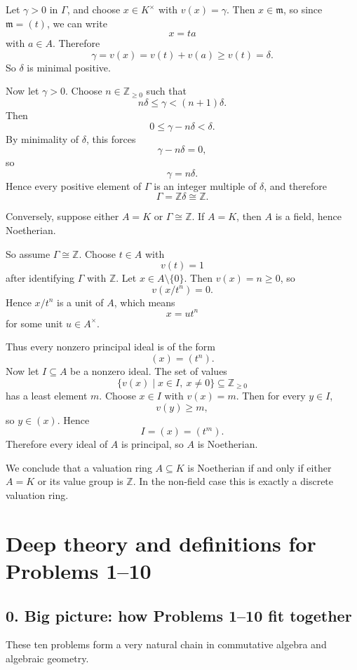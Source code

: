 \documentclass[12pt,a4paper]{article}
\theoremstyle{plain}
\theoremstyle{definition}      %
\begin{document}
Let \(\gamma>0\) in \(\Gamma\), and choose \(x\in K^\times\) with \(v(x)=\gamma\). Then \(x\in \mathfrak m\), so since \(\mathfrak m=(t)\), we can write
\[
x=ta
\]
with \(a\in A\). Therefore
\[
\gamma=v(x)=v(t)+v(a)\ge v(t)=\delta.
\]
So \(\delta\) is minimal positive.

Now let \(\gamma>0\). Choose \(n\in\mathbb Z_{\ge 0}\) such that
\[
n\delta\le \gamma < (n+1)\delta.
\]
Then
\[
0\le \gamma-n\delta<\delta.
\]
By minimality of \(\delta\), this forces
\[
\gamma-n\delta=0,
\]
so
\[
\gamma=n\delta.
\]
Hence every positive element of \(\Gamma\) is an integer multiple of \(\delta\), and therefore
\[
\Gamma=\mathbb Z\delta\cong \mathbb Z.
\]

Conversely, suppose either \(A=K\) or \(\Gamma\cong \mathbb Z\). If \(A=K\), then \(A\) is a field, hence Noetherian.

So assume \(\Gamma\cong \mathbb Z\). Choose \(t\in A\) with
\[
v(t)=1
\]
after identifying \(\Gamma\) with \(\mathbb Z\). Let \(x\in A\setminus\{0\}\). Then \(v(x)=n\ge 0\), so
\[
v(x/t^n)=0.
\]
Hence \(x/t^n\) is a unit of \(A\), which means
\[
x=ut^n
\]
for some unit \(u\in A^\times\).

Thus every nonzero principal ideal is of the form
\[
(x)=(t^n).
\]
Now let \(I\subseteq A\) be a nonzero ideal. The set of values
\[
\{v(x)\mid x\in I,\ x\neq 0\}\subseteq \mathbb Z_{\ge 0}
\]
has a least element \(m\). Choose \(x\in I\) with \(v(x)=m\). Then for every \(y\in I\),
\[
v(y)\ge m,
\]
so \(y\in (x)\). Hence
\[
I=(x)=(t^m).
\]
Therefore every ideal of \(A\) is principal, so \(A\) is Noetherian.

We conclude that a valuation ring \(A\subseteq K\) is Noetherian if and only if either \(A=K\) or its value group is \(\mathbb Z\). In the non-field case this is exactly a discrete valuation ring.

\section*{Deep theory and definitions for Problems 1--10}

\subsection*{0. Big picture: how Problems 1--10 fit together}

These ten problems form a very natural chain in commutative algebra and algebraic geometry.
\end{document}
